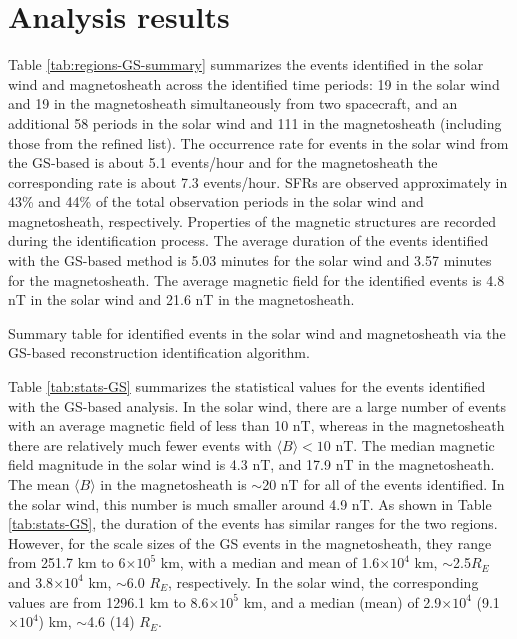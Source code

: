 \section{Analysis results}
Table \ref{tab:regions-GS-summary} summarizes the events identified in the solar wind and magnetosheath across the identified time periods: 19 in the solar wind and 19 in the magnetosheath simultaneously from two spacecraft, and an additional 58 periods in the solar wind and 111 in the magnetosheath (including those from the refined \cite{ToyEdens:2024} list). The occurrence rate for events in the solar wind from the GS-based is about 5.1 events/hour and for the magnetosheath the corresponding rate is about 7.3 events/hour. SFRs are observed approximately in 43\% and 44\% of the total observation periods in the solar wind and magnetosheath, respectively. Properties of the magnetic structures are recorded during the identification process. The average duration of the events identified with the GS-based method is 5.03 minutes for the solar wind and 3.57 minutes for the magnetosheath. The average magnetic field for the identified events is 4.8 nT in the solar wind and 21.6 nT in the magnetosheath.

\begin{table}
    \centering
    \caption{Summary table for identified events in the solar wind and magnetosheath via the GS-based reconstruction identification algorithm.}
    
    \label{tab:regions-GS-summary}
\end{table}

Table \ref{tab:stats-GS} summarizes the statistical values for the events identified with the GS-based analysis. In the solar wind, there are a large number of events with an average magnetic field of less than 10 nT, whereas in the magnetosheath there are relatively much fewer events with $\langle B\rangle < 10$ nT. The median magnetic field magnitude in the solar wind is 4.3 nT, and 17.9 nT in the magnetosheath. The mean $\langle B\rangle$ in the magnetosheath is $\sim$20 nT for all of the events identified. In the solar wind, this number is much smaller around 4.9 nT. As shown in Table \ref{tab:stats-GS}, the duration of the events has similar ranges for the two regions. However, for the scale sizes of the GS events in the magnetosheath, they range from 251.7 km to 6$\times 10^5$ km, with a median and mean of 1.6$\times 10^4$ km, $\sim$2.5$R_E$ and 3.8$\times 10^4$ km, $\sim$6.0 $R_E$, respectively. In the solar wind, the corresponding values are from 1296.1 km to 8.6$\times 10^5$ km, and a median (mean) of 2.9$\times 10^4$ (9.1$\times 10^4$) km, $\sim$4.6 (14) $R_E$.

